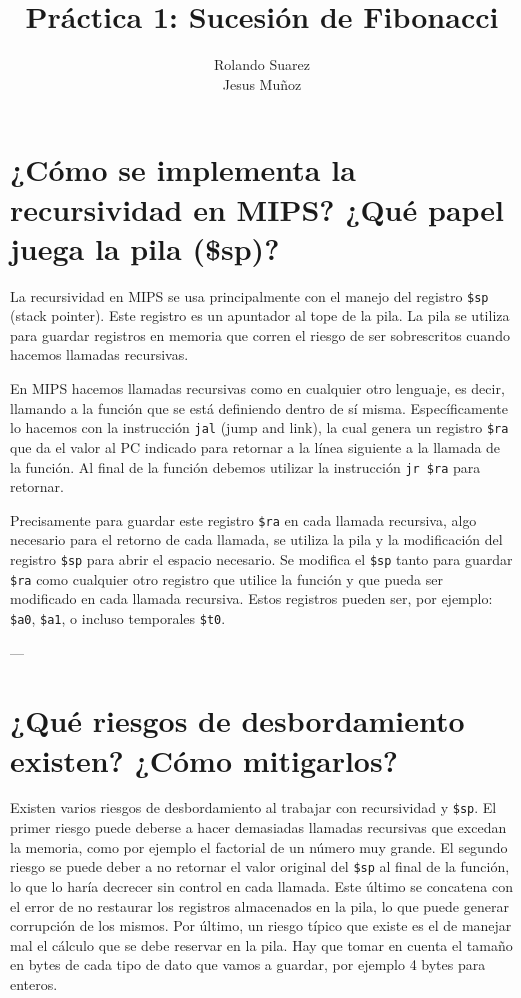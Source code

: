 \documentclass{article}
\title{Práctica 1: Sucesión de Fibonacci}
\author{Rolando Suarez \\
        Jesus Muñoz}
\date{}
\begin{document}
\maketitle

\section*{¿Cómo se implementa la recursividad en MIPS? ¿Qué papel juega la pila (\$sp)?}

La recursividad en MIPS se usa principalmente con el manejo del registro \texttt{\$sp} (stack pointer). Este registro es un apuntador al tope de la pila. La pila se utiliza para guardar registros en memoria que corren el riesgo de ser sobrescritos cuando hacemos llamadas recursivas.

En MIPS hacemos llamadas recursivas como en cualquier otro lenguaje, es decir, llamando a la función que se está definiendo dentro de sí misma. Específicamente lo hacemos con la instrucción \texttt{jal} (jump and link), la cual genera un registro \texttt{\$ra} que da el valor al PC indicado para retornar a la línea siguiente a la llamada de la función. Al final de la función debemos utilizar la instrucción \texttt{jr \$ra} para retornar.

Precisamente para guardar este registro \texttt{\$ra} en cada llamada recursiva, algo necesario para el retorno de cada llamada, se utiliza la pila y la modificación del registro \texttt{\$sp} para abrir el espacio necesario. Se modifica el \texttt{\$sp} tanto para guardar \texttt{\$ra} como cualquier otro registro que utilice la función y que pueda ser modificado en cada llamada recursiva. Estos registros pueden ser, por ejemplo: \texttt{\$a0}, \texttt{\$a1}, o incluso temporales \texttt{\$t0}.

---

\section*{¿Qué riesgos de desbordamiento existen? ¿Cómo mitigarlos?}

Existen varios riesgos de desbordamiento al trabajar con recursividad y \texttt{\$sp}. El primer riesgo puede deberse a hacer demasiadas llamadas recursivas que excedan la memoria, como por ejemplo el factorial de un número muy grande. El segundo riesgo se puede deber a no retornar el valor original del \texttt{\$sp} al final de la función, lo que lo haría decrecer sin control en cada llamada. Este último se concatena con el error de no restaurar los registros almacenados en la pila, lo que puede generar corrupción de los mismos. Por último, un riesgo típico que existe es el de manejar mal el cálculo que se debe reservar en la pila. Hay que tomar en cuenta el tamaño en bytes de cada tipo de dato que vamos a guardar, por ejemplo 4 bytes para enteros.
\end{document}
